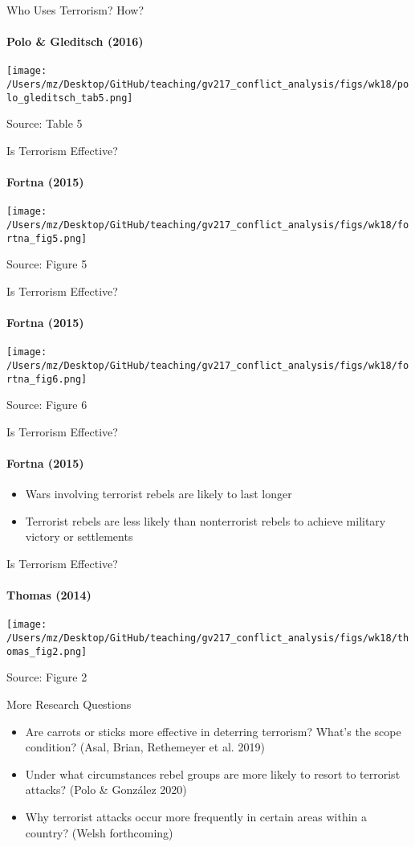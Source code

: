 \documentclass[handout]{beamer}
\begin{document}
\begin{frame}{Who Uses Terrorism? How?}
\framesubtitle{Polo \& Gleditsch (2016)}
    \pause
    \begin{center}
        \texttt{[image: /Users/mz/Desktop/GitHub/teaching/gv217\_conflict\_analysis/figs/wk18/polo\_gleditsch\_tab5.png]}
    \end{center}
    \footnotesize Source: Table 5
\end{frame}

\begin{frame}{Is Terrorism Effective?}
\framesubtitle{Fortna (2015)}
    \pause
    \begin{center}
        \texttt{[image: /Users/mz/Desktop/GitHub/teaching/gv217\_conflict\_analysis/figs/wk18/fortna\_fig5.png]}
    \end{center}
    \footnotesize Source: Figure 5
\end{frame}

\begin{frame}{Is Terrorism Effective?}
\framesubtitle{Fortna (2015)}
    \pause
    \begin{center}
        \texttt{[image: /Users/mz/Desktop/GitHub/teaching/gv217\_conflict\_analysis/figs/wk18/fortna\_fig6.png]}
    \end{center}
    \footnotesize Source: Figure 6
\end{frame}

\begin{frame}{Is Terrorism Effective?}
\framesubtitle{Fortna (2015)}
    \begin{itemize}
        \pause\item Wars involving terrorist rebels are likely to last longer
        \pause\item Terrorist rebels are less likely than nonterrorist rebels to achieve military victory or settlements
    \end{itemize}
\end{frame}

\begin{frame}{Is Terrorism Effective?}
\framesubtitle{Thomas (2014)}
    \pause
    \begin{center}
        \texttt{[image: /Users/mz/Desktop/GitHub/teaching/gv217\_conflict\_analysis/figs/wk18/thomas\_fig2.png]}
    \end{center}
    \footnotesize Source: Figure 2
\end{frame}

\begin{frame}{More Research Questions}
    \begin{itemize}
        \pause\item Are carrots or sticks more effective in deterring terrorism? What's the scope condition? (Asal, Brian, Rethemeyer et al. 2019)
        \pause\item Under what circumstances rebel groups are more likely to resort to terrorist attacks? (Polo \& González 2020)
        \pause\item Why terrorist attacks occur more frequently in certain areas within a country? (Welsh forthcoming)
    \end{itemize}
\end{frame}
\end{document}
